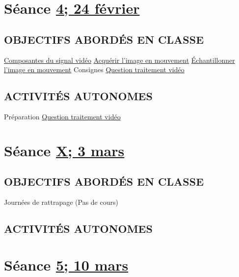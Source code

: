\documentclass[
]{book}
\begin{document}
\hypertarget{semaine_4}{%
\section{\texorpdfstring{Séance \protect\hyperlink{semaine_4}{4; 24 février}}{Séance 4; 24 février}}\label{semaine_4}}

\hypertarget{objectifs-aborduxe9s-en-classe-3}{%
\subsection{OBJECTIFS ABORDÉS EN CLASSE}\label{objectifs-aborduxe9s-en-classe-3}}

\protect\hyperlink{lexique}{Composantes du signal vidéo} \protect\hyperlink{acquerir}{Acquérir l'image en mouvement} \protect\hyperlink{echantillonner}{Échantillonner l'image en mouvement} Consignes \protect\hyperlink{sommatif_2}{Question traitement vidéo}

\hypertarget{activituxe9s-autonomes-3}{%
\subsection{ACTIVITÉS AUTONOMES}\label{activituxe9s-autonomes-3}}

Préparation \protect\hyperlink{sommatif_2}{Question traitement vidéo}

\hypertarget{semaine_5}{%
\section{\texorpdfstring{Séance \protect\hyperlink{semaine_5}{X; 3 mars}}{Séance X; 3 mars}}\label{semaine_5}}

\hypertarget{objectifs-aborduxe9s-en-classe-4}{%
\subsection{OBJECTIFS ABORDÉS EN CLASSE}\label{objectifs-aborduxe9s-en-classe-4}}

Journées de rattrapage (Pas de cours)

\hypertarget{activituxe9s-autonomes-4}{%
\subsection{ACTIVITÉS AUTONOMES}\label{activituxe9s-autonomes-4}}

\hypertarget{semaine_6}{%
\section{\texorpdfstring{Séance \protect\hyperlink{semaine_6}{5; 10 mars}}{Séance 5; 10 mars}}\label{semaine_6}}
\end{document}
